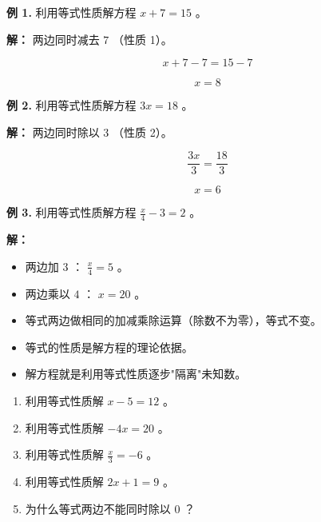 \begin{workedexamples}


\textbf{例 1.} 利用等式性质解方程 $x + 7 = 15$ 。

\textbf{解：} 两边同时减去 $7$ （性质 1）。

\[
x + 7 - 7 = 15 - 7
\]


\[
x = 8
\]


\textbf{例 2.} 利用等式性质解方程 $3x = 18$ 。

\textbf{解：} 两边同时除以 $3$ （性质 2）。

\[
\frac{3x}{3} = \frac{18}{3}
\]


\[
x = 6
\]


\textbf{例 3.} 利用等式性质解方程 $\frac{x}{4} - 3 = 2$ 。

\textbf{解：}

\begin{itemize}
  \item 两边加 $3$ ： $\frac{x}{4} = 5$ 。
  \item 两边乘以 $4$ ： $x = 20$ 。
\end{itemize}


\end{workedexamples}

\begin{keytakeaway}


\begin{itemize}
  \item 等式两边做相同的加减乘除运算（除数不为零），等式不变。
  \item 等式的性质是解方程的理论依据。
  \item 解方程就是利用等式性质逐步"隔离"未知数。
\end{itemize}


\end{keytakeaway}

\begin{practice}


\begin{enumerate}
  \item 利用等式性质解 $x - 5 = 12$ 。
  \item 利用等式性质解 $-4x = 20$ 。
  \item 利用等式性质解 $\frac{x}{3} = -6$ 。
  \item 利用等式性质解 $2x + 1 = 9$ 。
  \item 为什么等式两边不能同时除以 $0$ ？
\end{enumerate}


\end{practice}

